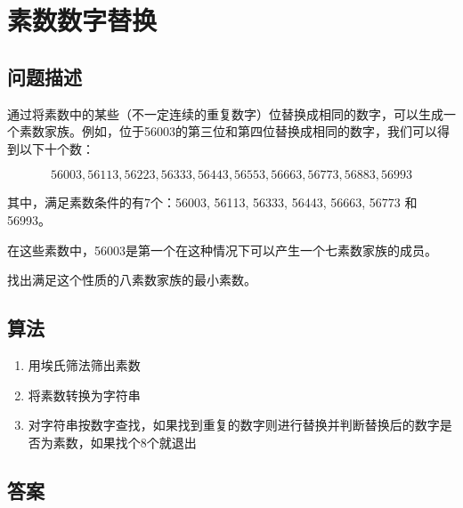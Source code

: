 \section{素数数字替换}
\subsection{问题描述}
\begin{tcolorbox}
	通过将素数中的某些（不一定连续的重复数字）位替换成相同的数字，可以生成一个素数家族。例如，位于56003的第三位和第四位替换成相同的数字，我们可以得到以下十个数：

	\[
		56003, 56113, 56223, 56333, 56443, 56553, 56663, 56773, 56883, 56993
	\]

	其中，满足素数条件的有7个：56003, 56113, 56333, 56443, 56663, 56773 和 56993。

	在这些素数中，56003是第一个在这种情况下可以产生一个七素数家族的成员。

	找出满足这个性质的八素数家族的最小素数。
\end{tcolorbox}

\subsection{算法}
\begin{enumerate}
	\item 用埃氏筛法筛出素数
	\item 将素数转换为字符串
	\item 对字符串按数字查找，如果找到重复的数字则进行替换并判断替换后的数字是否为素数，如果找个8个就退出
\end{enumerate}

\subsection{答案}
